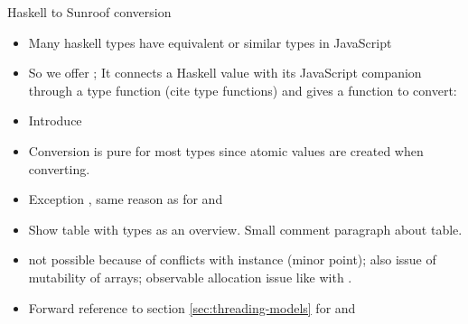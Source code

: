 Haskell to Sunroof conversion
\begin{itemize}
\item Many haskell types have equivalent or similar types in JavaScript
\item So we offer ; It connects a Haskell value with 
its JavaScript companion through a type function (cite type functions)
and gives a function to convert: 
\item Introduce 
\item Conversion is pure for most types since atomic values 
are created when converting.
\item Exception , same reason as for  and 
\item Show table with types as an overview. Small comment paragraph about table.
\item {} not possible because of conflicts with 
instance (minor point); also issue of mutability of arrays; observable 
allocation issue like with .
\item Forward reference to section \ref{sec:threading-models} for 
and 
\end{itemize}







